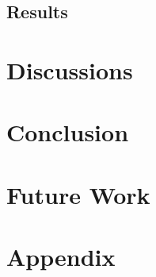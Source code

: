 \documentclass[]{article}
\begin{document}
\subsection{Results}



\section{Discussions}



\section{Conclusion}



\section{Future Work}








\appendix
\section{Appendix}
\end{document}
